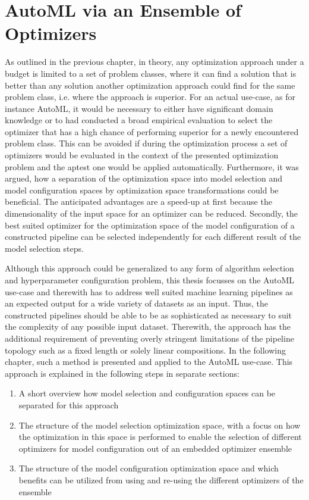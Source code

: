 %
\chapter{AutoML via an Ensemble of Optimizers}
\label{sec:approach}
As outlined in the previous chapter, in theory, any optimization approach under a budget is limited to a set of problem classes, where it can find a solution that is better than any solution another optimization approach could find for the same problem class, i.e. where the approach is superior.
For an actual use-case, as for instance AutoML, it would be necessary to either have significant domain knowledge or to had conducted a broad empirical evaluation to select the optimizer that has a high chance of performing superior for a newly encountered problem class.
This can be avoided if during the optimization process a set of optimizers would be evaluated in the context of the presented optimization problem and the aptest one would be applied automatically.\newline
Furthermore, it was argued, how a separation of the optimization space into model selection and model configuration spaces by optimization space transformations could be beneficial.
The anticipated advantages are a speed-up at first because the dimensionality of the input space for an optimizer can be reduced.
Secondly, the best suited optimizer for the optimization space of the model configuration of a constructed pipeline can be selected independently for each different result of the model selection steps.

Although this approach could be generalized to any form of algorithm selection and hyperparameter configuration problem, this thesis focusses on the AutoML use-case and therewith has to address well suited machine learning pipelines as an expected output for a wide variety of datasets as an input.
Thus, the constructed pipelines should be able to be as sophisticated as necessary to suit the complexity of any possible input dataset.
Therewith, the approach has the additional requirement of preventing overly stringent limitations of the pipeline topology such as a fixed length or solely linear compositions.\newline
In the following chapter, such a method is presented and applied to the AutoML use-case.
This approach is explained in the following steps in separate sections:
\begin{enumerate}
    \item A short overview how model selection and configuration spaces can be separated for this approach
    \item The structure of the model selection optimization space, with a focus on how the optimization in this space is performed to enable the selection of different optimizers for model configuration out of an embedded optimizer ensemble
    \item The structure of the model configuration optimization space and which benefits can be utilized from using and re-using the different optimizers of the ensemble
\end{enumerate}


